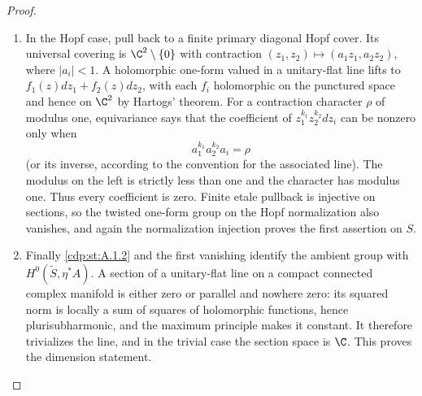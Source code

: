 \begin{proof}
\begin{enumerate}[label={$\langle1\rangle$\arabic*.},leftmargin=*]
\item In the Hopf case, pull back to a finite primary diagonal Hopf cover. Its universal covering is $\C^2\setminus\{0\}$ with contraction $(z_1,z_2)\mapsto(a_1z_1,a_2z_2)$, where $|a_i|<1$. A holomorphic one-form valued in a unitary-flat line lifts to $f_1(z)dz_1+f_2(z)dz_2$, with each $f_i$ holomorphic on the punctured space and hence on $\C^2$ by Hartogs' theorem. For a contraction character $\rho$ of modulus one, equivariance says that the coefficient of $z_1^{k_1}z_2^{k_2}dz_i$ can be nonzero only when
\[
 a_1^{k_1}a_2^{k_2}a_i=\rho
\]
(or its inverse, according to the convention for the associated line). The modulus on the left is strictly less than one and the character has modulus one. Thus every coefficient is zero. Finite etale pullback is injective on sections, so the twisted one-form group on the Hopf normalization also vanishes, and again the normalization injection proves the first assertion on $S$.

\item Finally \ref{cdp:st:A.1.2} and the first vanishing identify the ambient group with $H^0(\widetilde S,\eta^*A)$. A section of a unitary-flat line on a compact connected complex manifold is either zero or parallel and nowhere zero: its squared norm is locally a sum of squares of holomorphic functions, hence plurisubharmonic, and the maximum principle makes it constant. It therefore trivializes the line, and in the trivial case the section space is $\C$. This proves the dimension statement.

\end{enumerate}
\end{proof}

